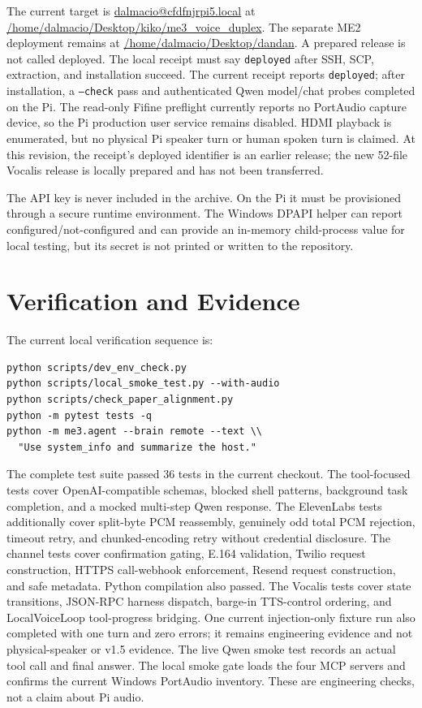 \documentclass[sigconf,nonacm]{acmart}
\begin{document}
\begin{sloppypar}
The current target is \url{dalmacio@cfdfnjrpi5.local} at
\url{/home/dalmacio/Desktop/kiko/me3_voice_duplex}. The separate ME2
deployment remains at \url{/home/dalmacio/Desktop/dandan}. A prepared release
is not called deployed. The local receipt must say \texttt{deployed} after SSH,
SCP, extraction, and installation succeed. The current receipt reports
\texttt{deployed}; after installation, a \texttt{--check} pass and
authenticated Qwen model/chat probes completed on the Pi. The read-only
Fifine preflight currently reports no PortAudio capture device, so the Pi
production user service remains disabled. HDMI playback is enumerated, but no
physical Pi speaker turn or human spoken turn is claimed. At this revision,
the receipt's deployed identifier is an earlier release; the new 52-file
Vocalis release is locally prepared and has not been transferred.
\end{sloppypar}

The API key is never included in the archive. On the Pi it must be provisioned
through a secure runtime environment. The Windows DPAPI helper can report
configured/not-configured and can provide an in-memory child-process value for
local testing, but its secret is not printed or written to the repository.

\section{Verification and Evidence}

The current local verification sequence is:

\begin{lstlisting}
python scripts/dev_env_check.py
python scripts/local_smoke_test.py --with-audio
python scripts/check_paper_alignment.py
python -m pytest tests -q
python -m me3.agent --brain remote --text \\
  "Use system_info and summarize the host."
\end{lstlisting}

The complete test suite passed 36 tests in the current checkout. The
tool-focused tests cover OpenAI-compatible schemas, blocked shell patterns,
background task completion, and a mocked multi-step Qwen response. The
ElevenLabs tests additionally cover split-byte PCM reassembly, genuinely odd
total PCM rejection, timeout retry, and chunked-encoding retry without
credential disclosure. The channel tests cover confirmation gating, E.164
validation, Twilio request construction, HTTPS call-webhook enforcement,
Resend request construction, and safe metadata. Python compilation also passed.
The Vocalis tests cover state transitions, JSON-RPC harness dispatch,
barge-in TTS-control ordering, and LocalVoiceLoop tool-progress bridging.
One current injection-only fixture run also completed with one turn and zero
errors; it remains engineering evidence and not physical-speaker or v1.5
evidence.
The live Qwen smoke test records an actual tool call and final answer. The
local smoke gate loads the four MCP servers and confirms the current Windows
PortAudio inventory. These are engineering checks, not a claim about Pi audio.
\end{document}
